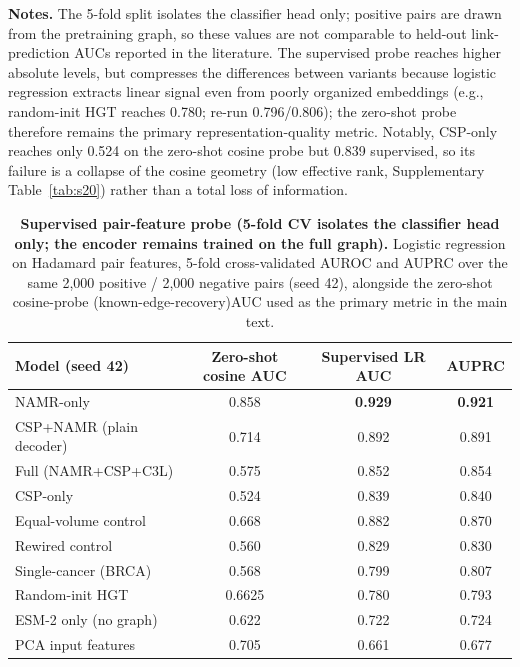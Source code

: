 \documentclass[11pt,a4paper]{article}
\newcommand{\supptab}[1]{Supplementary Table~\ref{#1}}
\begin{document}
\begin{table}[H]
\centering
\caption{\textbf{Supervised pair-feature probe (5-fold CV isolates the classifier head only; the encoder remains trained on the full graph).} Logistic regression on Hadamard pair features, 5-fold cross-validated AUROC and AUPRC over the same 2,000 positive / 2,000 negative pairs (seed 42), alongside the zero-shot cosine-probe (known-edge-recovery)AUC used as the primary metric in the main text.}

\smallskip
{\footnotesize \noindent \textbf{Notes.} The 5-fold split isolates the classifier head only; positive pairs are drawn from the pretraining graph, so these values are not comparable to held-out link-prediction AUCs reported in the literature. The supervised probe reaches higher absolute levels, but compresses the differences between variants because logistic regression extracts linear signal even from poorly organized embeddings (e.g., random-init HGT reaches 0.780; re-run 0.796/0.806); the zero-shot probe therefore remains the primary representation-quality metric. Notably, CSP-only reaches only 0.524 on the zero-shot cosine probe but 0.839 supervised, so its failure is a collapse of the cosine geometry (low effective rank, \supptab{tab:s20}) rather than a total loss of information.}

\label{tab:s14}
\footnotesize
\begin{tabular}{@{}lccc@{}}
\toprule
\textbf{Model (seed 42)} & \textbf{Zero-shot cosine AUC} & \textbf{Supervised LR AUC} & \textbf{AUPRC} \\
\midrule
NAMR-only & 0.858 & \textbf{0.929} & \textbf{0.921} \\
CSP+NAMR (plain decoder) & 0.714 & 0.892 & 0.891 \\
Full (NAMR+CSP+C3L) & 0.575 & 0.852 & 0.854 \\
CSP-only & 0.524 & 0.839 & 0.840 \\
Equal-volume control & 0.668 & 0.882 & 0.870 \\
Rewired control & 0.560 & 0.829 & 0.830 \\
Single-cancer (BRCA) & 0.568 & 0.799 & 0.807 \\
Random-init HGT & 0.6625 & 0.780 & 0.793 \\
ESM-2 only (no graph) & 0.622 & 0.722 & 0.724 \\
PCA input features & 0.705 & 0.661 & 0.677 \\
\bottomrule
\end{tabular}
\end{table}
\end{document}
